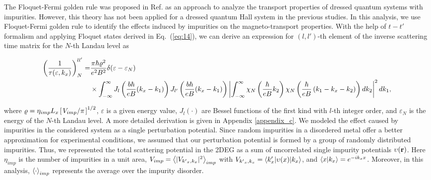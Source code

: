 \documentclass[
 reprint,
 amsmath,amssymb,
 aps,
 prb,
]{revtex4-2}
\begin{document}
The Floquet-Fermi golden rule was proposed in Ref. \cite{wackerl20} as an approach to analyze the transport properties of dressed quantum systems with impurities.
However, this theory has not been applied for a dressed quantum Hall system in the previous studies. In this analysis, we use Floquet-Fermi golden rule to identify the effects induced by impurities on the magneto-transport properties.
With the help of $t-t'$ formalism \cite{wackerl20,grifoni98,sambe75,peskin93,althorpe97} and applying Floquet states derived in Eq.~(\ref{eq:14}), we can derive an  expression for $(l,l')$-th element of the inverse scattering time matrix for the $N$-th Landau level as
\begin{widetext}
\begin{equation} \label{eq:15}
  \begin{aligned}
    \left(\frac{1}{\tau(\varepsilon,k_x)}\right)^{ll'}_N = &
    \frac{ \pi \hbar\varrho^2}{e^2B^2} \delta(\varepsilon - \varepsilon_N) \\
    & \times
    \int_{-\infty}^{\infty}
    J_l \bm{\left(} \frac{b\hbar}{eB}({k}_x - k_1) \bm{\right)}
    J_{l'} \bm{\left(} \frac{b\hbar}{eB}({k}_x - k_1) \bm{\right)}
    \left|
    \int_{-\infty}^{\infty}
    \chi_N \left( \frac{\hbar}{eB}k_2 \right)
    \chi_N \bm{\left(} \frac{\hbar}{eB}
    \left( k_1 - {k}_x - k_2 \right) \bm{\right)}
    dk_2 \right|^2 d k_1,
  \end{aligned}
\end{equation}
\end{widetext}
where $\varrho = \eta_{imp} L_x \left[\flatfrac{ V_{imp}}{\pi}\right]^{1/2}$, $\varepsilon$ is a given energy value, $J_l(\cdot)$ are Bessel functions of the first kind with $l$-th integer order, and $\varepsilon_N$ is the energy of the $N$-th Landau level.
A more detailed derivation is given in Appendix \ref{appendix_c}.
We modeled the effect caused by impurities in the considered system as a single perturbation potential.
Since random impurities in a disordered metal offer a better approximation for experimental conditions, we assumed that our perturbation potential is formed by a group of randomly distributed impurities.
Thus, we represented the total scattering potential in the 2DEG as a sum of uncorrelated single impurity potentials $\upsilon(\vb{r})$. Here $\eta_{imp}$ is the number of impurities in a unit area, $V_{imp} = \expval{|V_{{k'}_x,k_x}|^2}_{imp}$ with $V_{{k'}_x,k_x} = \mel**{k'_x}{\upsilon(x) }{k_x}$, and $\braket{x}{k_x} = e^{-ik_x x}$.
Moreover, in this analysis, $\expval{\cdot}_{imp}$ represents the average over the impurity disorder.
\end{document}
